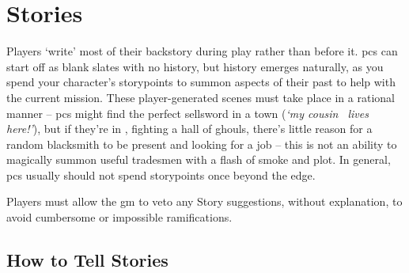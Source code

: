 \chapter[House of Stories]{Stories}
\label{stories}

Players `write' most of their backstory during play rather than before it.
\Glspl{pc} can start off as blank slates with no history, but history emerges naturally, as you spend your character's \glspl{storypoint} to summon aspects of their past to help with the current mission.
These player-generated scenes must take place in a rational manner -- \glspl{pc} might find the perfect sellsword in a town (\textit{`my cousin \composeHumanName\ lives here!'}), but if they're in , fighting a hall of ghouls, there's little reason for a random blacksmith to be present and looking for a job -- this is not an ability to magically summon useful tradesmen with a flash of smoke and plot.
In general, \glspl{pc} usually should not spend \glspl{storypoint} once beyond the \gls{edge}.

Players must allow the \gls{gm} to veto any Story suggestions, without explanation, to avoid cumbersome or impossible ramifications.

\section{How to Tell Stories}
\label{listOfStories}

